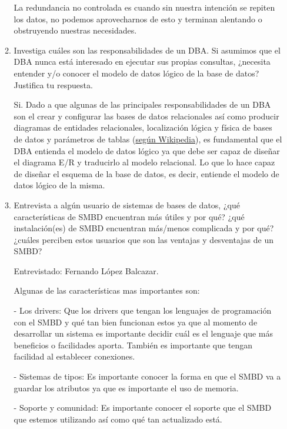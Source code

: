 \documentclass[12pt,a4paper]{article}
\begin{document}
\begin{enumerate}
\begin{enumerate}
				La redundancia no controlada es cuando sin nuestra intención se repiten los datos,
				no podemos aprovecharnos de esto y terminan alentando o obstruyendo nuestras necesidades.

			\item Investiga cuáles son las responsabilidades de un DBA. Si asumimos que el DBA nunca está interesado
				en ejecutar sus propias consultas, ¿necesita entender y/o conocer el modelo de datos lógico de la
				base de datos? Justifica tu respuesta.

				Si. Dado a que algunas de las principales responsabilidades de un DBA son el crear y configurar las bases de datos 
				relacionales así como producir diagramas de entidades relacionales, localización lógica y física de bases de datos y 
				parámetros de tablas
				(\href{https://es.wikipedia.org/wiki/Administrador_de_base_de_datos}{según Wikipedia}),
				es fundamental que el DBA entienda el modelo de datos lógico ya que debe ser
				capaz de diseñar el diagrama E/R y traducirlo al modelo relacional.
				Lo que lo hace capaz de diseñar el esquema de la base de datos,
				es decir, entiende el modelo de datos lógico de la misma.
				
			\item Entrevista a algún usuario de sistemas de bases de datos, ¿qué características de SMBD encuentran
				más útiles y por qué? ¿qué instalación(es) de SMBD encuentran más/menos complicada y por qué?
				¿cuáles perciben estos usuarios que son las ventajas y desventajas de un SMBD?
				
			      Entrevistado: Fernando López Balcazar.	
				
			      Algunas de las características mas importantes son:
                              
			      - Los drivers:
                              Que los drivers que tengan los lenguajes de programación con el SMBD y qué tan bien funcionan estos ya que al momento de          		       desarrollar un sistema es importante decidir cuál es el lenguaje que más beneficios o facilidades aporta. También es 				      importante que tengan facilidad al establecer conexiones.

			      - Sistemas de tipos:	
			      Es importante conocer la forma en que el SMBD va a guardar los atributos ya que es importante el uso de memoria.

			      - Soporte y comunidad:
			      Es importante conocer el soporte que el SMBD que estemos utilizando así como qué tan actualizado está.


\end{enumerate}
\end{enumerate}
\end{document}
